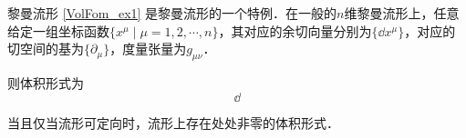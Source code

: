 \begin{example}{黎曼流形}
\autoref{VolFom_ex1} 是黎曼流形的一个特例．在一般的$n$维黎曼流形上，任意给定一组坐标函数$\{x^\mu\mid \mu=1, 2, \cdots, n\}$，其对应的余切向量分别为$\{\dd x^\mu\}$，对应的切空间的基为$\{\partial_\mu\}$，度量张量为$g_{\mu\nu}$．

则体积形式为
\begin{equation}
\dd
\end{equation}
\end{example}




\begin{theorem}{}
当且仅当流形可定向时，流形上存在处处非零的体积形式．
\end{theorem}






















